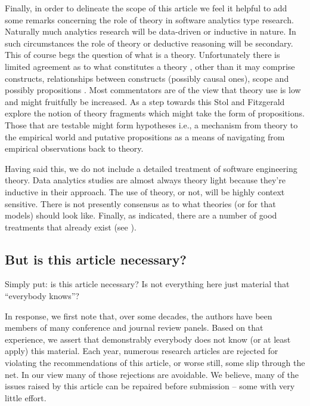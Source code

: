 \documentclass[10pt]{elsarticle}
\newcommand{\RRED}{\color{red}}
\newcommand{\BLACK}{\color{black}}
\begin{document}
\RRED
Finally, in order to delineate the scope of this article we feel it helpful to add some remarks concerning the role of theory in software analytics type research.  Naturally much analytics research will be data-driven or inductive in nature.  In such circumstances the role of theory or deductive reasoning will be secondary.  This of course begs the question of what is a theory.  Unfortunately there is limited agreement as to what constitutes a theory \cite{Sjob08,John12}, other than it may comprise constructs, relationships between constructs (possibly causal ones), scope and possibly propositions \cite{Stol13}. Most commentators are of the view that theory use is low and might fruitfully be increased.  As a step towards this Stol and Fitzgerald \cite{Stol13} explore the notion of theory fragments which might take the form of propositions.  Those that are testable might form hypotheses i.e., a mechanism from theory to the empirical world and putative propositions as a means of navigating from empirical observations back to theory.

Having said this, we do not include a detailed treatment of software engineering theory.  Data analytics studies are almost always theory light because they're  inductive in their approach.  The use of theory, or not, will be highly context sensitive.  There is not presently consensus as to what theories (or for that models) should look like.  Finally, as indicated, there are a number of good treatments that already exist (see \cite{Sjob08,John12,Stol13}).
\BLACK

\subsection{But is this article necessary?}
Simply put: is this article necessary? Is not everything here just material that ``everybody knows''?

In response, we first note that, over some decades, the authors have been members of many conference and journal review panels. Based on that experience, we assert that demonstrably everybody does not know (or at least apply) this material.  Each year, numerous research articles are rejected for violating the recommendations of this article, or worse still, some slip through the net.  In our view many of those rejections are avoidable. We believe, many of the issues raised by this article can be repaired before submission -- some with very little effort.
\end{document}
